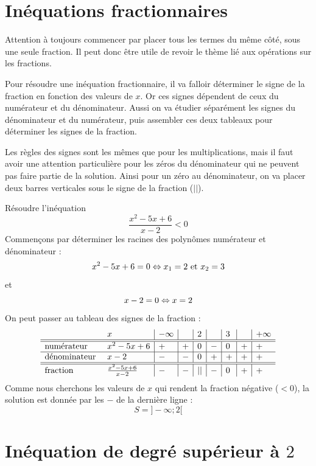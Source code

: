 \section{Inéquations fractionnaires}

Attention à toujours commencer par placer tous les termes du même côté, sous une seule fraction. Il peut donc être utile de revoir le thème lié aux opérations sur les fractions.

Pour résoudre une inéquation fractionnaire, il va falloir déterminer le signe de la fraction en fonction des valeurs de $x$. Or ces signes dépendent de ceux du numérateur et du dénominateur. Aussi on va étudier séparément les signes du dénominateur et du numérateur, puis assembler ces deux tableaux pour déterminer les signes de la fraction.

Les règles des signes sont les mêmes que pour les multiplications, mais il faut avoir une attention particulière pour les zéros du dénominateur qui ne peuvent pas faire partie de la solution. Ainsi pour un zéro au dénominateur, on va placer deux barres verticales sous le signe de la fraction ($||$).

\begin{exemple}
Résoudre l'inéquation 
$$
\frac{x^2 - 5x + 6}{x-2} < 0
$$
Commençons par déterminer les racines des polynômes numérateur et dénominateur :
$$
x^2 - 5x + 6 = 0 \Leftrightarrow x_1 = 2 \mbox{ et } x_2 = 3
$$
et 
$$
x-2 = 0 \Leftrightarrow x = 2
$$
On peut passer au tableau des signes de la fraction :
$$
\begin{array}{l l|l|l|l|l|l|l|l}
&x& -\infty & & 2 & & 3 & & +\infty\\
\hline
\hline
\mbox{numérateur }&x^2 -5x + 6 & + & + & 0 & - & 0 & + & +\\
\hline
\mbox{dénominateur }&x-2 &- & - & 0 & + & + & + & + \\
\hline 
\hline
\mbox{fraction }&\frac{x^2 - 5x + 6}{x-2} & - & - & || & - & 0 & + & + \\
\end{array}
$$
Comme nous cherchons les valeurs de $x$ qui rendent la fraction négative ($<0$), la solution est donnée par les $-$ de la dernière ligne :
$$
S= ]-\infty ; 2[
$$
\end{exemple}

\section{Inéquation de degré supérieur à $2$}

